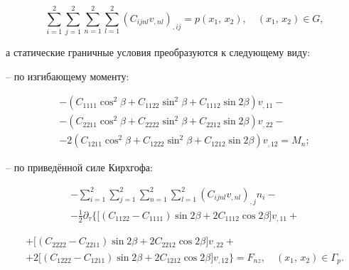 \begin{equation}

\label{nemir:eq16}

\sum\limits_{i = 1}^2 \sum\limits_{j = 1}^2 \sum\limits_{n = 1}^2 

\sum\limits_{l = 1}^2 \left( C_{ijnl} v_{,nl} \right)_{,ij}    = 

p( x_1 ,\,x_2 ),\quad (x_1 ,\,x_2 ) \in G,

\end{equation}

а статические граничные условия преобразуются к следующему виду: 



-- по изгибающему моменту:

\begin{multline}

\label{nemir:eq17}

 - (C_{1111} \cos ^2\beta + C_{1122} \sin ^2\beta + C_{1112} \sin 2\beta )v_{,11} - \\

 - (C_{2211} \cos ^2\beta + C_{2222} \sin ^2\beta + C_{2212} \sin 2\beta )v_{,22} - \\

 - 2(C_{1211} \cos ^2\beta + C_{1222} \sin ^2\beta + C_{1212} \sin 2\beta )v_{,12} = M_n;

\end{multline}



-- по приведённой силе Кирхгофа: 

\begin{multline*}

 - \sum\limits_{i = 1}^2 \sum\limits_{j = 1}^2 \sum\limits_{n = 1}^2 \sum\limits_{l = 1}^2 

\left( C_{ijnl} v_{,nl} \right)_{,j}n_i -\\

- \frac{1}{2}\partial _\tau \Big\{ \bigl[ ( C_{1122} - C_{1111} )  \sin 2\beta +  2C_{1112} \cos 2\beta \bigr]v_{,11} + 

\end{multline*}

\begin{multline}

\label{nemir:eq18}

+ \bigl[ ( C_{2222} - C_{2211} ) \sin 2\beta + 2C_{2212} \cos 2\beta  \bigr]v_{,22} + \\

+ 2\bigl[ ( C_{1222} - C_{1211} ) \sin 2\beta + 2C_{1212} \cos 2\beta  \bigr]v_{,12}  \Big\} = F_{nz}, 

\quad (x_1 ,\,x_2 ) \in \Gamma _p .

\end{multline}

